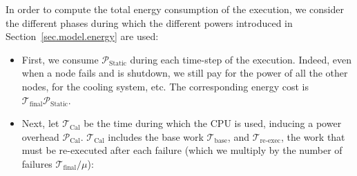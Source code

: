 \documentclass[a4paper]{article}
\newcommand{\ema}[1]{\ensuremath{#1}\xspace}
\renewcommand{\time}[1][]{\ema{\mathcal{T}_{\text{#1}}}}
\newcommand{\tbase}{\time[base]}
\newcommand{\tfin}{\time[final]}
\newcommand{\tCal}{\time[Cal]}
\newcommand{\twork}{\time[re-exec]}
\newcommand{\power}[1][]{\ema{\mathcal{P}_{\text{#1}}}}
\newcommand{\pCal}{\power[Cal]}
\newcommand{\pIdle}{\power[Static]}
\newcommand{\pStatic}{\power[Static]}
\begin{document}
In order to compute the total energy consumption of the execution, we consider the different phases
during which the different powers introduced in Section~\ref{sec.model.energy} are used: 
\begin{itemize}
	\item First,  we consume \pStatic during each time-step of the execution.
Indeed, even when a node fails and is shutdown, we still pay for the power of all the 
other nodes, for the cooling system, etc. The corresponding energy cost is $\tfin \pIdle$.
\smallskip
	\item Next, let \tCal be the time during which the CPU is used, inducing a power overhead \pCal. 
	\tCal 	includes the base work \tbase, and 
\twork, the work that must be re-executed after each failure (which we multiply 
		by the number of failures $\tfin / \mu$):
		

\end{itemize}
\end{document}
